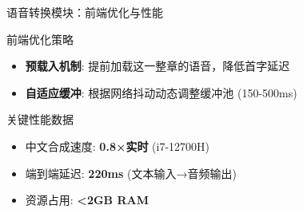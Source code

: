 \documentclass{beamer}
\begin{document}
\begin{frame}{语音转换模块：前端优化与性能}
    \begin{block}{前端优化策略}
        \begin{itemize}
            \item \textbf{预载入机制}: 提前加载这一整章的语音，降低首字延迟
            \item \textbf{自适应缓冲}: 根据网络抖动动态调整缓冲池 (150-500ms)
        \end{itemize}
    \end{block}
    \begin{alertblock}{关键性能数据}
        \begin{itemize}
            \item 中文合成速度: \textbf{0.8×实时} (i7-12700H)
            \item 端到端延迟: \textbf{220ms} (文本输入→音频输出)
            \item 资源占用: \textbf{<2GB RAM}
        \end{itemize}
    \end{alertblock}
\end{frame}


\end{document}
